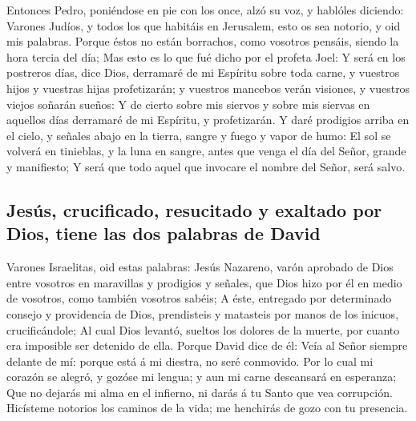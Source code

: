  Entonces Pedro, poniéndose en pie con los once, alzó su
voz, y hablóles diciendo: Varones Judíos, y todos los que habitáis en
Jerusalem, esto os sea notorio, y oid mis palabras. 
Porque éstos no están borrachos, como vosotros pensáis, siendo la hora
tercia del día;  Mas esto es lo que fué dicho por el
profeta Joel:  Y será en los postreros días, dice Dios,
derramaré de mi Espíritu sobre toda carne, y vuestros hijos y vuestras
hijas profetizarán; y vuestros mancebos verán visiones, y vuestros
viejos soñarán sueños:  Y de cierto sobre mis siervos y
sobre mis siervas en aquellos días derramaré de mi Espíritu, y
profetizarán.  Y daré prodigios arriba en el cielo, y
señales abajo en la tierra, sangre y fuego y vapor de humo:
 El sol se volverá en tinieblas, y la luna en sangre,
antes que venga el día del Señor, grande y manifiesto;  Y
será que todo aquel que invocare el nombre del Señor, será salvo.

\hypertarget{jesuxfas-crucificado-resucitado-y-exaltado-por-dios-tiene-las-dos-palabras-de-david}{%
\subsection{Jesús, crucificado, resucitado y exaltado por Dios, tiene
las dos palabras de
David}\label{jesuxfas-crucificado-resucitado-y-exaltado-por-dios-tiene-las-dos-palabras-de-david}}

 Varones Israelitas, oid estas palabras: Jesús Nazareno,
varón aprobado de Dios entre vosotros en maravillas y prodigios y
señales, que Dios hizo por él en medio de vosotros, como también
vosotros sabéis;  A éste, entregado por determinado
consejo y providencia de Dios, prendisteis y matasteis por manos de los
inicuos, crucificándole;  Al cual Dios levantó, sueltos
los dolores de la muerte, por cuanto era imposible ser detenido de ella.
 Porque David dice de él: Veía al Señor siempre delante
de mí: porque está á mi diestra, no seré conmovido.  Por
lo cual mi corazón se alegró, y gozóse mi lengua; y aun mi carne
descansará en esperanza;  Que no dejarás mi alma en el
infierno, ni darás á tu Santo que vea corrupción. 
Hicísteme notorios los caminos de la vida; me henchirás de gozo con tu
presencia.

